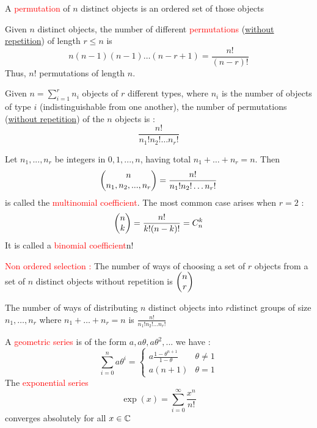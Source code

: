 \documentclass[12pt,a4paper]{article}
\begin{document}
 A \textcolor{red}{permutation} of $n$ distinct objects is an ordered set of those objects

 Given $n$ distinct objects, the number of different \textcolor{red}{permutations} (\uline{without repetition}) of length $r \leq n$ is 
\begin{equation}
    n(n-1)(n-1)\ldots(n-r+1) = \frac{n!}{(n-r)!}
    \label{equ:permutations}
\end{equation}
Thus, $n!$ permutations of length $n$.

 Given $n = \sum_{i=1}^{r}n_i$ objects of $r$ different types, where $n_i$ is the number of objects of type $i$ (indistinguishable from one another), the number of permutations (\uline{without repetition}) of the $n$ objects is :
\begin{equation}
    \frac{n!}{n_1!n_2!\ldots n_r!}
\end{equation}

 Let $n_1,...,n_r$ be integers in $0,1,...,n$, having total $n_1+\ldots+n_r = n$. Then 
\begin{equation}
    \begin{pmatrix} n \\ n_1,n_2,...,n_r \end{pmatrix} = \frac{n!}{n_1!n_2!\ldots n_r!}
\end{equation}
is called the \textcolor{red}{multinomial coefficient}. The most common case arises when $r = 2$ :
\begin{equation}
    \begin{pmatrix} n \\ k \end{pmatrix} = \frac{n!}{k!(n-k)!} = C_n^k
\end{equation}
It is called a \textcolor{red}{binomial coefficient}n!

 \textcolor{red}{Non ordered selection :} The number of ways of choosing a set of $r$ objects from a set of $n$ distinct objects without repetition is $\begin{pmatrix} n \\ r \end{pmatrix}$

 The number of ways of distributing $n$ distinct objects into $r$distinct groups of size $n_1,\ldots,n_r$ where $n_1+\ldots+n_r = n$ is $\frac{n!}{n_1!n_2!\ldots n_r!}$

 A \textcolor{red}{geometric series} is of the form $a, a\theta, a\theta^2,...$ we have :
\begin{equation}
    \sum_{i=0}^{n} a\theta^i = 
    \left\{\begin{array}{ll}
        a\frac{1-\theta^{n+1}}{1-\theta} & \theta \neq 1\\
        a(n+1) & \theta = 1
    \end{array}\right.
\end{equation}
The \textcolor{red}{exponential series} 
\begin{equation}
    \exp(x) = \sum_{i=0}^{\infty} \frac{x^n}{n!}
\end{equation}
converges absolutely for all $x \in \mathbb{C}$
\end{document}
